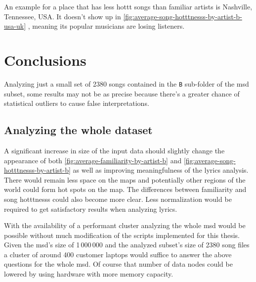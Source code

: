 \documentclass[                                                             %
        12pt,                                                                   %
        twoside                                                                 %
    ]{scrartcl}                                                                 %
\begin{document}
An example for a place that has less hottt songs than familiar artists 
is Nashville, Tennessee, USA. 
It doesn't show up in \autoref{fig:average-song-hotttnesss-by-artist-b-usa-uk}%
, 
meaning its popular musicians are losing listeners.

\section{Conclusions}

Analyzing just a small set of 2380 songs 
contained in the \texttt{B} sub-folder of 
the \gls{msd} subset, some results may not be as precise
because there's a greater chance of statistical outliers
to cause false interpretations.

\subsection{Analyzing the whole dataset}

A significant increase in size 
of the input data should slightly 
change the appearance of both 
\autoref{fig:average-familiarity-by-artist-b} 
and \autoref{fig:average-song-hotttnesss-by-artist-b} as well 
as improving meaningfulness of the lyrics analysis.
There would remain less  space on the maps 
and potentially other regions of the world 
could form hot spots on the map.
The differences between familiarity and song hotttnesss
could also become more clear.
Less normalization would be required to get satisfactory
results when analyzing lyrics.

With the availability of a performant cluster 
analyzing the whole \gls{msd} would be possible 
without much modification of the scripts 
implemented for this thesis.
Given the \gls{msd}'s size of 1\,000\,000
and the analyzed subset's size of 2380 song files
a cluster of around 400 customer laptops would suffice
to answer the above questions for the whole \gls{msd}.
Of course that number of data nodes could be lowered
by using hardware with more memory capacity.
\end{document}
